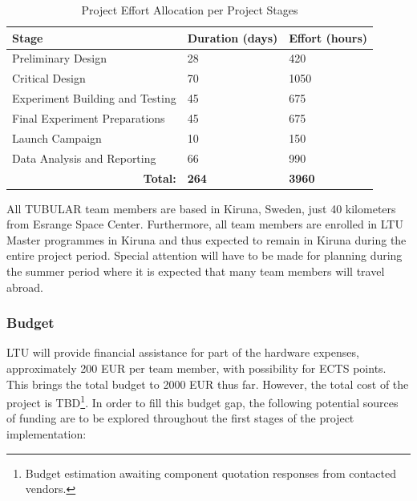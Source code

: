 \documentclass[a4paper,12pt,twoside]{article}
\begin{document}
\begin{table}[H]
\centering
\begin{tabular}{l|l|l|}
\hline
\multicolumn{1}{|l|}{\textbf{Stage}} & \textbf{Duration (days)} & \textbf{Effort (hours)} \\ \hline
\multicolumn{1}{|l|}{Preliminary Design} & 28 & 420 \\ \hline
\multicolumn{1}{|l|}{Critical Design} & 70 & 1050 \\ \hline
\multicolumn{1}{|l|}{Experiment Building and Testing} & 45 & 675 \\ \hline
\multicolumn{1}{|l|}{Final Experiment Preparations} & 45 & 675 \\ \hline
\multicolumn{1}{|l|}{Launch Campaign} & 10 & 150 \\ \hline
\multicolumn{1}{|l|}{Data Analysis and Reporting} & 66 & 990 \\ \hline
\multicolumn{1}{r|}{\textbf{Total:}} & \textbf{264} & \textbf{3960} \\ \cline{2-3} 
\end{tabular}
\caption{Project Effort Allocation per Project Stages}
\label{tab:effort-allocation-stages}
\end{table}
\raggedbottom

All TUBULAR team members are based in Kiruna, Sweden, just 40 kilometers from Esrange Space Center. Furthermore, all team members are enrolled in LTU Master programmes in Kiruna and thus expected to remain in Kiruna during the entire project period. Special attention will have to be made for planning during the summer period where it is expected that many team members will travel abroad. 

\subsubsection{Budget}
LTU will provide financial assistance for part of the hardware expenses, approximately 200 EUR per team member, with possibility for ECTS points. This brings the total budget to 2000 EUR thus far. However, the total cost of the project is TBD\footnote{Budget estimation awaiting component quotation responses from contacted vendors.}. In order to fill this budget gap, the following potential sources of funding are to be explored throughout the first stages of the project implementation:
\end{document}
